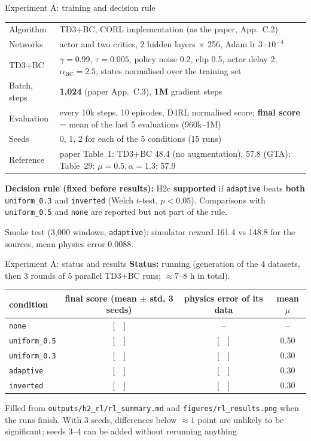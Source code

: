 \documentclass[aspectratio=169,11pt]{beamer}
\newcommand{\yes}{\textcolor{ok}{\textbf{supported}}}
\begin{document}
\begin{frame}{Experiment A: training and decision rule}
\small
\begin{tabularx}{\linewidth}{lY}
\toprule
Algorithm & TD3+BC, CORL implementation (as the paper, App.~C.2)\\
Networks & actor and two critics, 2 hidden layers $\times$ 256, Adam lr $3\cdot10^{-4}$\\
TD3+BC & $\gamma=0.99$, $\tau=0.005$, policy noise 0.2, clip 0.5, actor delay 2, $\alpha_{\text{BC}}=2.5$, states normalised over the training set\\
Batch, steps & \textbf{1{,}024} (paper App.~C.3), \textbf{1M} gradient steps\\
Evaluation & every 10k steps, 10 episodes, D4RL normalised score; \textbf{final score} = mean of the last 5 evaluations (960k--1M)\\
Seeds & 0, 1, 2 for each of the 5 conditions (15 runs)\\
Reference & paper Table~1: TD3+BC 48.4 (no augmentation), 57.8 (GTA); Table~29: $\mu=0.5,\alpha=1.3$: 57.9\\
\bottomrule
\end{tabularx}
\vspace{0.4em}

\textbf{Decision rule (fixed before results):} H2c \yes{} if \texttt{adaptive} beats \textbf{both} \texttt{uniform\_0.3} and \texttt{inverted} (Welch $t$-test, $p<0.05$). Comparisons with \texttt{uniform\_0.5} and \texttt{none} are reported but not part of the rule.
\vspace{0.3em}

\scriptsize Smoke test (3{,}000 windows, \texttt{adaptive}): simulator reward 161.4 vs 148.8 for the sources, mean physics error 0.0088.
\end{frame}

\begin{frame}{Experiment A: status and results}
\textbf{Status:} running (generation of the 4 datasets, then 3 rounds of 5 parallel TD3+BC runs; $\approx7$--8 h in total).
\vspace{0.5em}

\centering\small
\begin{tabular}{@{}lccc@{}}
\toprule
condition & final score (mean $\pm$ std, 3 seeds) & physics error of its data & mean $\mu$\\
\midrule
\texttt{none} & [\ \ ] & -- & --\\
\texttt{uniform\_0.5} & [\ \ ] & [\ \ ] & 0.50\\
\texttt{uniform\_0.3} & [\ \ ] & [\ \ ] & 0.30\\
\texttt{adaptive} & [\ \ ] & [\ \ ] & 0.30\\
\texttt{inverted} & [\ \ ] & [\ \ ] & 0.30\\
\bottomrule
\end{tabular}
\vspace{0.5em}

\raggedright\small Filled from \texttt{outputs/h2\_rl/rl\_summary.md} and \texttt{figures/rl\_results.png} when the runs finish.
With 3 seeds, differences below $\approx1$ point are unlikely to be significant; seeds 3--4 can be added without rerunning anything.
\end{frame}
\end{document}
